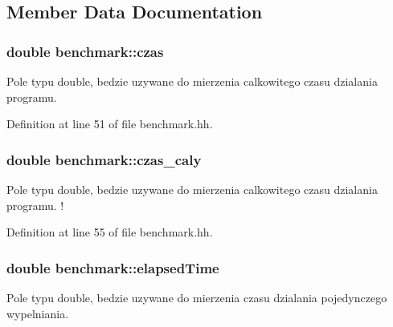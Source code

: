 \subsection{Member Data Documentation}
\hypertarget{classbenchmark_a563b747421276232836b7711b6881ec8}{
\subsubsection[{czas}]{\setlength{\rightskip}{0pt plus 5cm}double benchmark\-::czas\hspace{0.3cm}{\ttfamily [private]}}}\label{classbenchmark_a563b747421276232836b7711b6881ec8}


Pole typu double, bedzie uzywane do mierzenia calkowitego czasu dzialania programu. 



Definition at line 51 of file benchmark.\-hh.

\hypertarget{classbenchmark_af677300c0b0a0086f306a0a08a6172b9}{
\subsubsection[{czas\-\_\-caly}]{\setlength{\rightskip}{0pt plus 5cm}double benchmark\-::czas\-\_\-caly\hspace{0.3cm}{\ttfamily [private]}}}\label{classbenchmark_af677300c0b0a0086f306a0a08a6172b9}


Pole typu double, bedzie uzywane do mierzenia calkowitego czasu dzialania programu. ! 



Definition at line 55 of file benchmark.\-hh.

\hypertarget{classbenchmark_a90e6eda0144befd3f3bc1a881904fb57}{
\subsubsection[{elapsed\-Time}]{\setlength{\rightskip}{0pt plus 5cm}double benchmark\-::elapsed\-Time\hspace{0.3cm}{\ttfamily [private]}}}\label{classbenchmark_a90e6eda0144befd3f3bc1a881904fb57}


Pole typu double, bedzie uzywane do mierzenia czasu dzialania pojedynczego wypelniania. 



